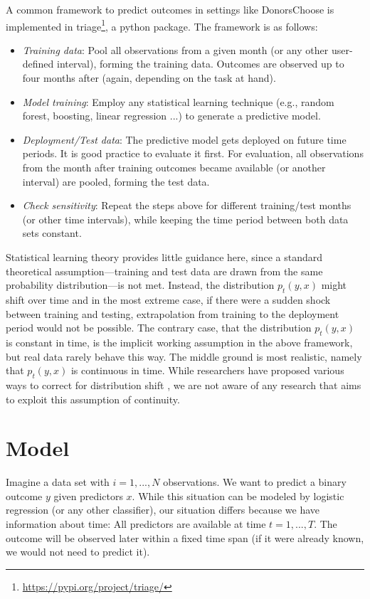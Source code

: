 \documentclass{article}
\begin{document}
A common framework to predict outcomes in settings like DonorsChoose is implemented in triage\footnote{\url{https://pypi.org/project/triage/}}, a python package. The framework is as follows: 
\begin{itemize}
    \item \textit{Training data}: Pool all observations from a given month (or any other user-defined interval), forming the training data. Outcomes are observed up to four months after (again, depending on the task at hand).
    \item \textit{Model training}: Employ any statistical learning technique (e.g., random forest, boosting, linear regression ...) to generate a predictive model.
    \item \textit{Deployment/Test data}: The predictive model gets deployed on future time periods. It is good practice to evaluate it first. For evaluation, all observations from the month after training outcomes became available (or another interval) are pooled, forming the test data.
    \item \textit{Check sensitivity}: Repeat the steps above for different training/test months (or other time intervals), while keeping the time period between both data sets constant.
\end{itemize}
Statistical learning theory provides little guidance here, since a standard theoretical assumption---training and test data are drawn from the same probability distribution---is not met. Instead, the distribution $p_t(y, x)$ might shift over time and in the most extreme case, if there were a sudden shock between training and testing, extrapolation from training to the deployment period would not be possible. The contrary case, that the distribution $p_t(y, x)$ is constant in time, is the implicit working assumption in the above framework, but real data rarely behave this way. The middle ground is most realistic, namely that $p_t(y, x)$ is continuous in time. While researchers have proposed various ways to correct for distribution shift \citep[e.g.,][p. 133ff.]{varshney_trustworthy_2021}, we are not aware of any research that aims to exploit this assumption of continuity.

\section{Model}\label{sec:model}

Imagine a data set with $i = 1, ..., N$ observations. We want to predict a binary outcome $y$ given predictors $x$. While this situation can be modeled by logistic regression (or any other classifier), our situation differs because we have information about time: All predictors are available at time $t = 1, ..., T$. The outcome will be observed later within a fixed time span (if it were already known, we would not need to predict it). 
\end{document}
